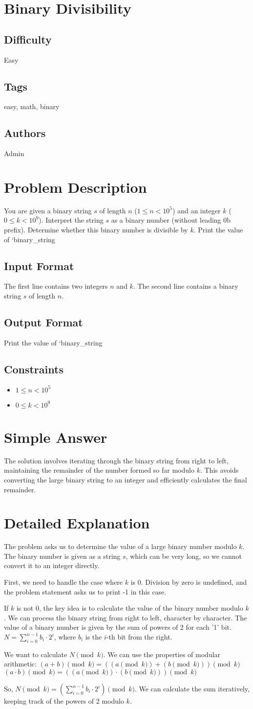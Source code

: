 \documentclass{article}
\newcommand{\ProblemTitle}{Binary Divisibility}
\newcommand{\Difficulty}{Easy}
\newcommand{\Tags}{easy, math, binary}
\newcommand{\Authors}{Admin}
\newcommand{\Statement}{
You are given a binary string $s$ of length $n$ ($1 \leq n < 10^5$) and an integer $k$ ($0 \leq k < 10^9$).
Interpret the string $s$ as a binary number (without leading 0b prefix).
Determine whether this binary number is divisible by $k$.
Print the value of `binary_string %
}
\newcommand{\InputFormat}{
The first line contains two integers $n$ and $k$.
The second line contains a binary string $s$ of length $n$.
}
\newcommand{\OutputFormat}{
Print the value of `binary_string %
}
\newcommand{\Constraints}{
\begin{itemize}
    \item $1 \leq n < 10^5$
    \item $0 \leq k < 10^9$
\end{itemize}
}
\newcommand{\SimpleAnswer}{
The solution involves iterating through the binary string from right to left, maintaining the remainder of the number formed so far modulo $k$. This avoids converting the large binary string to an integer and efficiently calculates the final remainder.
}
\newcommand{\DetailedExplanation}{
The problem asks us to determine the value of a large binary number modulo $k$.
The binary number is given as a string $s$, which can be very long, so we cannot convert it to an integer directly.

First, we need to handle the case where $k$ is 0. Division by zero is undefined, and the problem statement asks us to print -1 in this case.

If $k$ is not 0, the key idea is to calculate the value of the binary number modulo $k$.
We can process the binary string from right to left, character by character.
The value of a binary number is given by the sum of powers of 2 for each '1' bit.
$N = \sum_{i=0}^{n-1} b_i \cdot 2^i$, where $b_i$ is the $i$-th bit from the right.

We want to calculate $N \pmod{k}$. We can use the properties of modular arithmetic:
$(a + b) \pmod{k} = ((a \pmod{k}) + (b \pmod{k})) \pmod{k}$
$(a \cdot b) \pmod{k} = ((a \pmod{k}) \cdot (b \pmod{k})) \pmod{k}$

So, $N \pmod{k} = (\sum_{i=0}^{n-1} b_i \cdot 2^i) \pmod{k}$.
We can calculate the sum iteratively, keeping track of the powers of 2 modulo $k$.
}
\begin{document}
\section*{\ProblemTitle}

\subsection*{Difficulty}
\Difficulty

\subsection*{Tags}
\Tags

\subsection*{Authors}
\Authors

\section*{Problem Description}
\Statement

\subsection*{Input Format}
\InputFormat

\subsection*{Output Format}
\OutputFormat

\subsection*{Constraints}
\Constraints

\section*{Simple Answer}
\SimpleAnswer

\section*{Detailed Explanation}
\DetailedExplanation
\end{document}
